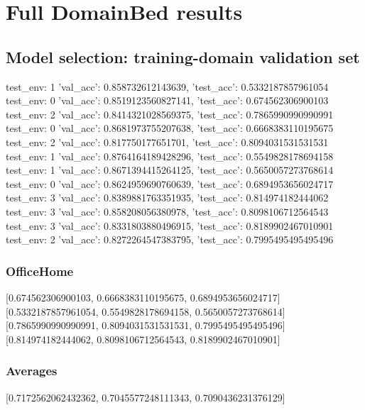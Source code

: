 \documentclass{article}
\begin{document}
\section{Full DomainBed results}

\subsection{Model selection: training-domain validation set}
test_env: 1
{'val_acc': 0.858732612143639, 'test_acc': 0.5332187857961054}
test_env: 0
{'val_acc': 0.8519123560827141, 'test_acc': 0.674562306900103}
test_env: 2
{'val_acc': 0.8414321028569375, 'test_acc': 0.7865990990990991}
test_env: 0
{'val_acc': 0.8681973755207638, 'test_acc': 0.6668383110195675}
test_env: 2
{'val_acc': 0.817750177651701, 'test_acc': 0.8094031531531531}
test_env: 1
{'val_acc': 0.8764164189428296, 'test_acc': 0.5549828178694158}
test_env: 1
{'val_acc': 0.8671394415264125, 'test_acc': 0.5650057273768614}
test_env: 0
{'val_acc': 0.8624959690760639, 'test_acc': 0.6894953656024717}
test_env: 3
{'val_acc': 0.8389881763351935, 'test_acc': 0.814974182444062}
test_env: 3
{'val_acc': 0.858208056380978, 'test_acc': 0.8098106712564543}
test_env: 3
{'val_acc': 0.8331803880496915, 'test_acc': 0.8189902467010901}
test_env: 2
{'val_acc': 0.8272264547383795, 'test_acc': 0.7995495495495496}

\subsubsection{OfficeHome}
[0.674562306900103, 0.6668383110195675, 0.6894953656024717]
[0.5332187857961054, 0.5549828178694158, 0.5650057273768614]
[0.7865990990990991, 0.8094031531531531, 0.7995495495495496]
[0.814974182444062, 0.8098106712564543, 0.8189902467010901]

\begin{center}
\end{center}

\subsubsection{Averages}
[0.7172562062432362, 0.7045577248111343, 0.7090436231376129]

\begin{center}
\end{center}
\end{document}
